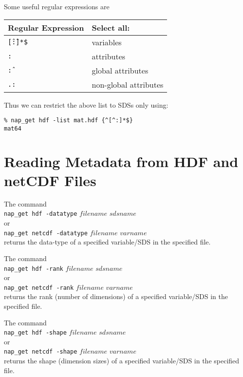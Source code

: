   

Some useful regular expressions are

\begin{tabular}{|l|l|}
    \hline 
      \textbf{Regular Expression} & \textbf{Select all:}
    \\
    \hline 
        \texttt{\^[\^:]*\$} & variables
    \\
    \hline 
        \texttt{:} & attributes
    \\
    \hline 
        \texttt{\^:} & global attributes
    \\
    \hline 
        \texttt{.:} & non-global attributes
    \\
  \hline
\end{tabular}

  

Thus we can restrict the above list to SDSs only using:
  \begin{verbatim}
% nap_get hdf -list mat.hdf {^[^:]*$}
mat64
\end{verbatim}

  \section{
    \label{Metadata}Reading Metadata from HDF and netCDF Files
  }

  

The command
  \\
  \texttt{nap\_get hdf -datatype} 
  $filename$ $sdsname$
  \\or
  \\
  \texttt{nap\_get netcdf -datatype} 
  $filename$ $varname$
  \\returns the data-type of a specified variable/SDS in the
  specified file.
  

The command
  \\
  \texttt{nap\_get hdf -rank} 
  $filename$ $sdsname$
  \\or
  \\
  \texttt{nap\_get netcdf -rank} 
  $filename$ $varname$
  \\returns the rank (number of dimensions) of a specified
  variable/SDS in the specified file.
  

The command
  \\
  \texttt{nap\_get hdf -shape} 
  $filename$ $sdsname$
  \\or
  \\
  \texttt{nap\_get netcdf -shape} 
  $filename$ $varname$
  \\returns the shape (dimension sizes) of a specified variable/SDS
  in the specified file.
  

